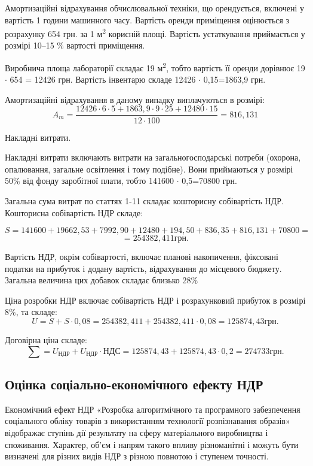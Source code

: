 Амортизаційні відрахування обчислювальної техніки, що орендується, включені у вартість 1 години машинного часу. Вартість оренди приміщення оцінюється з розрахунку 654 грн. за 1 м\textsuperscript{2} корисній площі. Вартість устаткування приймається у розмірі 10--15 \% вартості приміщення. 

Виробнича площа лабораторії складає 19 м\textsuperscript{2}, тобто вартість її оренди дорівнює 19 $\cdot$  654 = 12426 грн. Вартість інвентарю складе 12426 $\cdot$  0,15=1863,9 грн.

Амортизаційні відрахування в даному випадку виплачуються в розмірі:
\begin{equation}
A_m = \frac{12426  \cdot  6  \cdot  5+1863,9  \cdot  9  \cdot  25+12480  \cdot  15}{12  \cdot  100} = 816,131 \nonumber
\end{equation}

Накладні витрати.

Накладні витрати включають витрати на загальногосподарські потреби (охорона, опалювання, загальне освітлення і тому подібне). Вони приймаються у розмірі 50\% від фонду заробітної плати, тобто 141600 $\cdot$  0,5=70800 грн. 

Загальна сума витрат по статтях 1-11 складає кошторисну собівартість НДР. Кошторисна собівартість НДР складе:

\begin{equation}
S = 141600+19662,53+7992,90+12480+194,50+836,35+816,131 + 70800 = \nonumber
\end{equation}
\begin{equation}
 = 254382,411 грн. \nonumber
\end{equation}

Вартість НДР, окрім собівартості, включає планові накопичення, фіксовані податки на прибуток і додану вартість, відрахування до місцевого бюджету. Загальна величина цих добавок складає близько 28\%

Ціна розробки НДР включає собівартість НДР і розрахунковий прибуток в розмірі 8\%, та складе:
\begin{equation}
U=S+S  \cdot  0,08= 254382,411+254382,411  \cdot  0,08=125874,43 грн. \nonumber
\end{equation}

Договірна ціна складе: 
\begin{equation}
\sum = U_{\text{НДР}} + U_{\text{НДР}} \cdot {\text{НДС}} = 125874,43+125874,43  \cdot  0,2=274733 грн. \nonumber
\end{equation}

\subsection{Оцінка соціально-економічного ефекту НДР}
Економічний ефект НДР «Розробка алгоритмічного та програмного забезпечення соціального обліку товарів з використанням технології розпізнавання образів» відображає ступінь дії результату на сферу матеріального виробництва і споживання. Характер, об'єм і напрям такого впливу різноманітні і можуть бути визначені для різних видів НДР з різною повнотою і ступенем точності.

